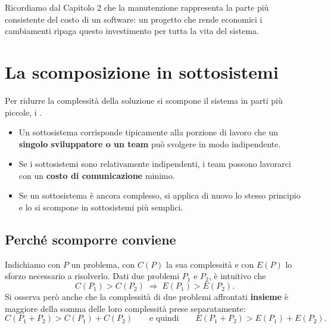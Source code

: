 Ricordiamo dal Capitolo 2 che la manutenzione rappresenta la parte più consistente del costo di un software: un progetto
che rende economici i cambiamenti ripaga questo investimento per tutta la vita del sistema.

\section{La scomposizione in sottosistemi}

Per ridurre la complessità della soluzione si scompone il sistema in parti più piccole, i .
\begin{itemize}
  \item Un sottosistema corrisponde tipicamente alla porzione di lavoro che un \textbf{singolo sviluppatore o un team} può
        svolgere in modo indipendente.
  \item Se i sottosistemi sono relativamente indipendenti, i team possono lavorarci con un \textbf{costo di comunicazione}
        minimo.
  \item Se un sottosistema è ancora complesso, si applica di nuovo lo stesso principio e lo si scompone in sottosistemi più
        semplici.
\end{itemize}

\subsection{Perché scomporre conviene}

Indichiamo con $P$ un problema, con $C(P)$ la sua complessità e con $E(P)$ lo sforzo necessario a risolverlo. Dati due
problemi $P_1$ e $P_2$, è intuitivo che
\[
  C(P_1) > C(P_2) \;\Rightarrow\; E(P_1) > E(P_2).
\]
Si osserva però anche che la complessità di due problemi affrontati \textbf{insieme} è maggiore della somma delle loro
complessità prese separatamente:
\[
  C(P_1 + P_2) > C(P_1) + C(P_2) \qquad\text{e quindi}\qquad E(P_1 + P_2) > E(P_1) + E(P_2).
\]


